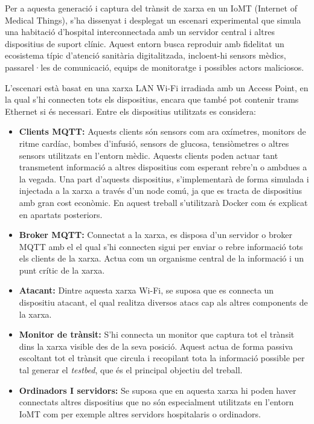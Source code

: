   Per a aquesta generació i captura del trànsit de xarxa en un IoMT (Internet of Medical Things), s’ha dissenyat i desplegat un escenari experimental que simula una habitació d’hospital interconnectada amb un servidor central i altres dispositius de suport clínic. Aquest entorn busca reproduir amb fidelitat un ecosistema típic d’atenció sanitària digitalitzada, incloent-hi sensors mèdics, passarel·les de comunicació, equips de monitoratge i possibles actors maliciosos.

  L’escenari està basat en una xarxa LAN Wi-Fi irradiada amb un Access Point, en la qual s’hi connecten tots els dispositius, encara que també pot contenir trams Ethernet si és necessari. Entre els dispositius utilitzats es considera:

  \begin{itemize}
    \item \textbf{Clients MQTT:} Aquests clients són sensors com ara oxímetres, monitors de ritme cardíac, bombes d’infusió, sensors de glucosa, tensiòmetres o altres sensors utilitzats en l’entorn mèdic. Aquests clients poden actuar tant transmetent informació a altres dispositius com esperant rebre’n o ambdues a la vegada. Una part d’aquests dispositius, s’implementarà de forma simulada i injectada a la xarxa a través d’un node comú, ja que es tracta de dispositius amb gran cost econòmic. En aquest treball s’utilitzarà Docker com és explicat en apartats posteriors.
    \item \textbf{Broker MQTT:} Connectat a la xarxa, es disposa d’un servidor o broker MQTT amb el el qual s’hi connecten sigui per enviar o rebre informació tots els clients de la xarxa. Actua com un organisme central de la informació i un punt crític de la xarxa.
    \item \textbf{Atacant:} Dintre aquesta xarxa Wi-Fi, se suposa que es connecta un dispositiu atacant, el qual realitza diversos atacs cap als altres components de la xarxa.
    \item \textbf{Monitor de trànsit:} S’hi connecta un monitor que captura tot el trànsit dins la xarxa visible des de la seva posició. Aquest actua de forma passiva escoltant tot el trànsit que circula i recopilant tota la informació possible per tal generar el \textit{testbed}, que és el principal objectiu del treball.
    \item \textbf{Ordinadors I servidors:} Se suposa que en aquesta xarxa hi poden haver connectats altres dispositius que no són especialment utilitzats en l’entorn IoMT com per exemple altres servidors hospitalaris o ordinadors.
  \end{itemize}

